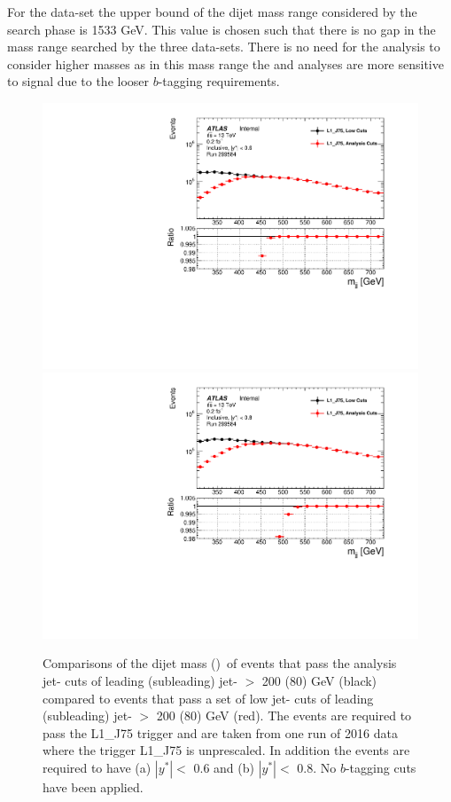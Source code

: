 For the \lm{} data-set the upper bound of the dijet mass range considered by the search phase is 1533 GeV.
This value is chosen such that there is no gap in the mass range searched by the three data-sets.
There is no need for the \lm{} analysis to consider higher masses as in this mass range the \summer{} and \hm{}
analyses are more sensitive to signal due to the looser $b$-tagging requirements.

\begin{figure}[!ht]
  \begin{center}
    \captionsetup[subfigure]{aboveskip=0pt,justification=centering}
     {\includegraphics[width=0.5\linewidth, angle=0]{figs/Dibjet/LowMass/evt-mjj_yStar0p6.pdf}}\hspace{-2mm}
     {\includegraphics[width=0.5\linewidth, angle=0]{figs/Dibjet/LowMass/evt-mjj_yStar0p8.pdf}}
  \end{center}
  \caption{Comparisons of the dijet mass (\mjj{})~of events that pass the analysis jet-\pT{} cuts of leading (subleading) jet-\pT{} $>$ 200 (80) GeV (black)
    compared to events that pass a set of low jet-\pT{} cuts of leading (subleading) jet-\pT{} $>$ 200 (80) GeV (red).
    The events are required to pass the L1\_J75 trigger and are taken from one run of 2016 data where the trigger L1\_J75 is unprescaled.
    In addition the events are required to have (a) $|y^*| <$ 0.6 and (b) $|y^*| <$ 0.8.
    No $b$-tagging cuts have been applied.}
     \label{fig:evt-lowmass_turnon}
\end{figure}

